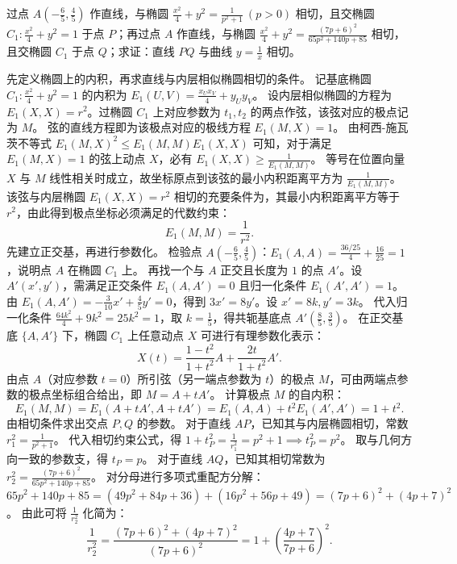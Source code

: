 \begin{example}
过点 $A\left(-\frac{6}{5},\frac{4}{5}\right)$ 作直线，与椭圆 $\frac{x^2}{4} + y^2 = \frac{1}{p^2 + 1}\ (p > 0)$ 相切，且交椭圆 $C_1: \frac{x^2}{4} + y^2 = 1$ 于点 $P$；再过点 $A$ 作直线，与椭圆 $\frac{x^2}{4} + y^2 = \frac{(7p + 6)^2}{65p^2 + 140p + 85}$ 相切，且交椭圆 $C_1$ 于点 $Q$；求证：直线 $PQ$ 与曲线 $y = \frac{1}{x}$ 相切。
\end{example}
\begin{solution}
先定义椭圆上的内积，再求直线与内层相似椭圆相切的条件。
记基底椭圆 $C_1: \frac{x^2}{4} + y^2 = 1$ 的内积为 $E_1(U, V) = \frac{x_U x_V}{4} + y_U y_V$。
设内层相似椭圆的方程为 $E_1(X, X) = r^2$。过椭圆 $C_1$ 上对应参数为 $t_1, t_2$ 的两点作弦，该弦对应的极点记为 $M$。
弦的直线方程即为该极点对应的极线方程 $E_1(M, X) = 1$。
由柯西-施瓦茨不等式 $E_1(M, X)^2 \le E_1(M, M) E_1(X, X)$ 可知，对于满足 $E_1(M, X) = 1$ 的弦上动点 $X$，必有 $E_1(X, X) \ge \frac{1}{E_1(M, M)}$。
等号在位置向量 $X$ 与 $M$ 线性相关时成立，故坐标原点到该弦的最小内积距离平方为 $\frac{1}{E_1(M, M)}$。
该弦与内层椭圆 $E_1(X, X) = r^2$ 相切的充要条件为，其最小内积距离平方等于 $r^2$，由此得到极点坐标必须满足的代数约束：
\[ E_1(M, M) = \frac{1}{r^2}. \]
先建立正交基，再进行参数化。
检验点 $A\left(-\frac{6}{5}, \frac{4}{5}\right)$：$E_1(A, A) = \frac{36/25}{4} + \frac{16}{25} = 1$，说明点 $A$ 在椭圆 $C_1$ 上。
再找一个与 $A$ 正交且长度为 $1$ 的点 $A'$。设 $A'(x', y')$，需满足正交条件 $E_1(A, A') = 0$ 且归一化条件 $E_1(A', A') = 1$。
由 $E_1(A, A') = -\frac{3}{10}x' + \frac{4}{5}y' = 0$，得到 $3x' = 8y'$。设 $x' = 8k, y' = 3k$。
代入归一化条件 $\frac{64k^2}{4} + 9k^2 = 25k^2 = 1$，取 $k = \frac{1}{5}$，得共轭基底点 $A'\left(\frac{8}{5}, \frac{3}{5}\right)$。
在正交基底 $\{A, A'\}$ 下，椭圆 $C_1$ 上任意动点 $X$ 可进行有理参数化表示：
\[ X(t) = \frac{1-t^2}{1+t^2} A + \frac{2t}{1+t^2} A'. \]
由点 $A$（对应参数 $t=0$）所引弦（另一端点参数为 $t$）的极点 $M$，可由两端点参数的极点坐标组合给出，即 $M = A + t A'$。
计算极点 $M$ 的自内积：
\[ E_1(M, M) = E_1(A + t A', A + t A') = E_1(A, A) + t^2 E_1(A', A') = 1 + t^2. \]
由相切条件求出交点 $P, Q$ 的参数。
对于直线 $AP$，已知其与内层椭圆相切，常数 $r_1^2 = \frac{1}{p^2 + 1}$。
代入相切约束公式，得 $1 + t_P^2 = \frac{1}{r_1^2} = p^2 + 1 \implies t_P^2 = p^2$。
取与几何方向一致的参数支，得 $t_P = p$。
对于直线 $AQ$，已知其相切常数为 $r_2^2 = \frac{(7p + 6)^2}{65p^2 + 140p + 85}$。
对分母进行多项式重配方分解：$65p^2 + 140p + 85 = (49p^2 + 84p + 36) + (16p^2 + 56p + 49) = (7p + 6)^2 + (4p + 7)^2$。
由此可将 $\frac{1}{r_2^2}$ 化简为：
\[ \frac{1}{r_2^2} = \frac{(7p + 6)^2 + (4p + 7)^2}{(7p + 6)^2} = 1 + \left(\frac{4p + 7}{7p + 6}\right)^2. \]

\end{solution}
